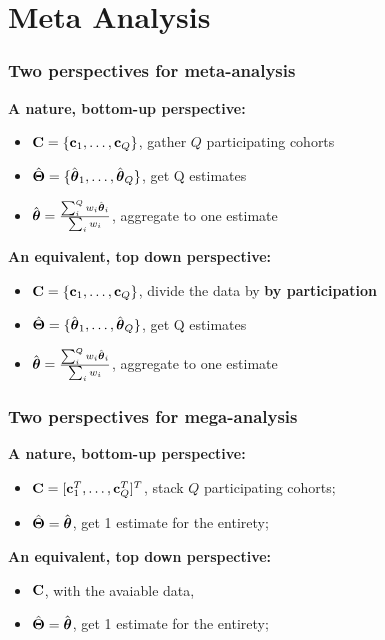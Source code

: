 \documentclass{beamer}
\begin{document}
\section{Meta Analysis}
\begin{frame}\frametitle{Two perspectives for meta-analysis}
  \textbf{A nature, bottom-up perspective:}
  \begin{itemize}
  \item $\mathbf{C} = \{\mathbf{c}_1, \dots, \mathbf{c}_Q \}$, gather $Q$ participating cohorts
  \item $\hat{\boldsymbol{\Theta}}=\{\hat{\boldsymbol{\theta}}_1, \dots, \hat{\boldsymbol{\theta}}_Q\}$, get Q estimates
  \item $\hat{\boldsymbol{\theta}} = \frac{\sum_i^Q w_i \hat{\boldsymbol{\theta}}_i}{\sum_i w_i}$, aggregate to one estimate
  \end{itemize}
  \textbf{An equivalent, top down perspective:}
  \begin{itemize}
  \item $\mathbf{C} = \{\mathbf{c}_1, \dots, \mathbf{c}_Q \}$, divide the data by \textbf{by participation}
  \item $\hat{\boldsymbol{\Theta}}=\{\hat{\boldsymbol{\theta}}_1, \dots, \hat{\boldsymbol{\theta}}_Q\}$, get Q estimates
  \item $\hat{\boldsymbol{\theta}} = \frac{\sum_i^Q w_i \hat{\boldsymbol{\theta}}_i}{\sum_i w_i}$, aggregate to one estimate
  \end{itemize}
\end{frame}
\begin{frame}\frametitle{Two perspectives for mega-analysis}
  \textbf{A nature, bottom-up perspective:}
  \begin{itemize}
  \item $\mathbf{C} = [\mathbf{c}_1^T, \dots, \mathbf{c}_Q^T ]^T$, stack $Q$ participating cohorts;
  \item $\hat{\boldsymbol{\Theta}}=\hat{\boldsymbol{\theta}}$, get 1 estimate for the entirety;
  \end{itemize}
  \textbf{An equivalent, top down perspective:}
  \begin{itemize}
  \item $\mathbf{C}$, with the avaiable data,
  \item $\hat{\boldsymbol{\Theta}}=\hat{\boldsymbol{\theta}}$, get 1 estimate for the entirety;
  \end{itemize}
\end{frame}
\end{document}
